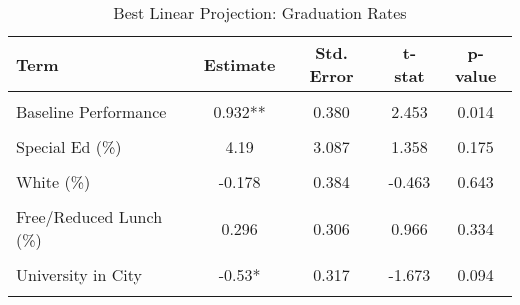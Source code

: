 \begin{table}[!h]
\centering
\caption{\label{tab:blp_afgr}Best Linear Projection: Graduation Rates}
\centering
\begin{tabular}[t]{lcccc}
\toprule
Term & Estimate & Std. Error & t-stat & p-value\\
\midrule
\cellcolor{gray!10}{(Intercept)} & \cellcolor{gray!10}{-1.847**} & \cellcolor{gray!10}{0.721} & \cellcolor{gray!10}{-2.563} & \cellcolor{gray!10}{0.010}\\
Baseline Performance & 0.932** & 0.380 & 2.453 & 0.014\\
\cellcolor{gray!10}{Log of Enrollment} & \cellcolor{gray!10}{0.105**} & \cellcolor{gray!10}{0.047} & \cellcolor{gray!10}{2.247} & \cellcolor{gray!10}{0.025}\\
Special Ed (\%) & 4.19 & 3.087 & 1.358 & 0.175\\
\cellcolor{gray!10}{Black (\%)} & \cellcolor{gray!10}{-0.898} & \cellcolor{gray!10}{0.667} & \cellcolor{gray!10}{-1.347} & \cellcolor{gray!10}{0.178}\\
White (\%) & -0.178 & 0.384 & -0.463 & 0.643\\
\cellcolor{gray!10}{TPS-Charter Spending (\% diff)} & \cellcolor{gray!10}{-0.033} & \cellcolor{gray!10}{0.282} & \cellcolor{gray!10}{-0.116} & \cellcolor{gray!10}{0.908}\\
Free/Reduced Lunch (\%) & 0.296 & 0.306 & 0.966 & 0.334\\
\cellcolor{gray!10}{Hispanic (\%)} & \cellcolor{gray!10}{0.157} & \cellcolor{gray!10}{0.423} & \cellcolor{gray!10}{0.371} & \cellcolor{gray!10}{0.711}\\
University in City & -0.53* & 0.317 & -1.673 & 0.094\\
\cellcolor{gray!10}{Exempt from State/District Regs} & \cellcolor{gray!10}{-0.019} & \cellcolor{gray!10}{0.034} & \cellcolor{gray!10}{-0.561} & \cellcolor{gray!10}{0.575}\\
\bottomrule
\end{tabular}
\end{table}
